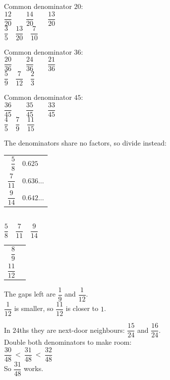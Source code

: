 \documentclass[aspectratio=169]{beamer}
\makeatletter
\newcommand{\barstack}[1]{%
  {\renewcommand{\arraystretch}{1.2}%
   \begin{tabular}{@{}r@{\;\;}l@{}}#1\end{tabular}}%
}
\newcommand{\work}[1]{%
  \begin{tabular}{@{}r@{\;=\;}l@{}}#1\end{tabular}%
}
\makeatother
\begin{document}
  {Common denominator $20$:\\[0.4em]
   $\dfrac{12}{20}\qquad \dfrac{14}{20}\qquad \dfrac{13}{20}$\\[0.4em]
   $\dfrac{3}{5}\quad \dfrac{13}{20}\quad \dfrac{7}{10}$}

  {Common denominator $36$:\\[0.4em]
   $\dfrac{20}{36}\qquad \dfrac{24}{36}\qquad \dfrac{21}{36}$\\[0.4em]
   $\dfrac{5}{9}\quad \dfrac{7}{12}\quad \dfrac{2}{3}$}

  {Common denominator $45$:\\[0.4em]
   $\dfrac{36}{45}\qquad \dfrac{35}{45}\qquad \dfrac{33}{45}$\\[0.4em]
   $\dfrac{4}{5}\quad \dfrac{7}{9}\quad \dfrac{11}{15}$}

  {The denominators share no factors, so divide instead:\\[0.4em]
   \work{$\dfrac58$ & $0.625$ \\[0.2em]
         $\dfrac{7}{11}$ & $0.636\ldots$ \\[0.2em]
         $\dfrac{9}{14}$ & $0.642\ldots$}\\[0.4em]
   $\dfrac58\quad \dfrac{7}{11}\quad \dfrac{9}{14}$}

  {\barstack{$\dfrac89$ & \fbar{9}{8} \\[0.95em]
             $\dfrac{11}{12}$ & \fbar{12}{11}}
   \par\vspace{0.5em}
   The gaps left are $\dfrac19$ and $\dfrac{1}{12}$.\\[0.3em]
   $\dfrac{1}{12}$ is smaller, so $\dfrac{11}{12}$ is closer to $1$.}

  {In $24$ths they are next-door neighbours:
   $\dfrac{15}{24}$ and $\dfrac{16}{24}$.\\[0.4em]
   Double both denominators to make room:\\[0.3em]
   $\dfrac{30}{48}\ <\ \dfrac{31}{48}\ <\ \dfrac{32}{48}$\\[0.4em]
   So $\dfrac{31}{48}$ works.}
\end{document}
